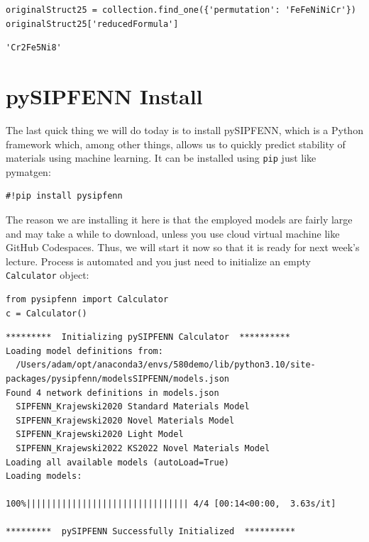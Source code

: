 \begin{verbatim}
originalStruct25 = collection.find_one({'permutation': 'FeFeNiNiCr'})
originalStruct25['reducedFormula']
\end{verbatim}

\begin{verbatim}
'Cr2Fe5Ni8'
\end{verbatim}

\hypertarget{pysipfenn-install}{%
\section{pySIPFENN Install}\label{pysipfenntutorial:pysipfenn-install}}

The last quick thing we will do today is to install pySIPFENN, which is
a Python framework which, among other things, allows us to quickly
predict stability of materials using machine learning. It can be
installed using \texttt{pip} just like pymatgen:

\begin{verbatim}
#!pip install pysipfenn
\end{verbatim}

The reason we are installing it here is that the employed models are
fairly large and may take a while to download, unless you use cloud
virtual machine like GitHub Codespaces. Thus, we will start it now so
that it is ready for next week's lecture. Process is automated and you
just need to initialize an empty \texttt{Calculator}
object:

\begin{verbatim}
from pysipfenn import Calculator
c = Calculator()
\end{verbatim}

\begin{verbatim}
*********  Initializing pySIPFENN Calculator  **********
Loading model definitions from: 
  /Users/adam/opt/anaconda3/envs/580demo/lib/python3.10/site-packages/pysipfenn/modelsSIPFENN/models.json
Found 4 network definitions in models.json
  SIPFENN_Krajewski2020 Standard Materials Model
  SIPFENN_Krajewski2020 Novel Materials Model
  SIPFENN_Krajewski2020 Light Model
  SIPFENN_Krajewski2022 KS2022 Novel Materials Model
Loading all available models (autoLoad=True)
Loading models:

100%|||||||||||||||||||||||||||||||| 4/4 [00:14<00:00,  3.63s/it]

*********  pySIPFENN Successfully Initialized  **********
\end{verbatim}

